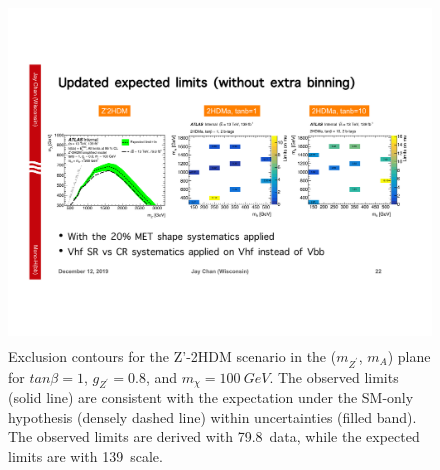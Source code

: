 \begin{figure}[!htb]
    \centering
    \includegraphics[width=12cm, height=9cm, trim={2.5cm 7.5cm 17.6cm 8cm}, clip]{chapters/c9/figures/ZPrime2HDMLimit-139Exp.pdf}
    \caption{Exclusion contours for the Z'-2HDM scenario in the ($m_{Z^{\prime}}$, $m_{A}$) plane for $tan\beta= 1$, $g_{Z^{\prime}}=0.8$, and $m_{\chi}=100~GeV$. 
    The observed limits (solid line) are consistent with the expectation under the SM-only hypothesis (densely dashed line) within uncertainties (filled band). 
    The observed limits are derived with 79.8~\ifb data, while the expected limits are with 139~\ifb scale.}
    \label{fig:zprime-2hdm-limit-139}
\end{figure}
